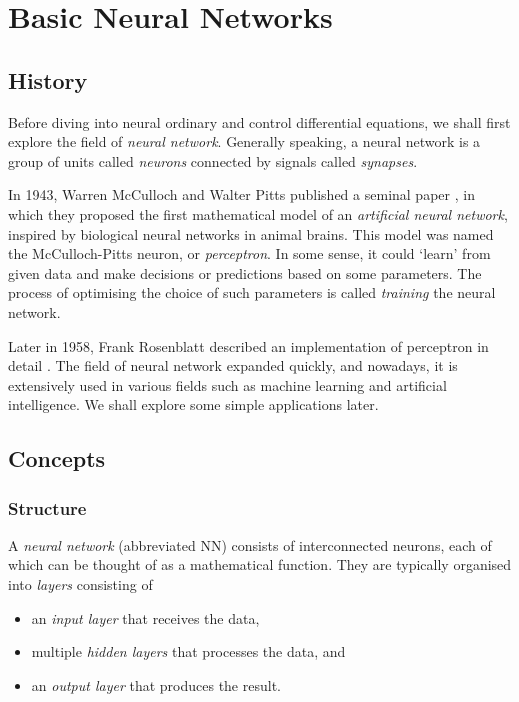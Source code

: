 \documentclass[a4paper,11pt,titlepage]{article}
\theoremstyle{definition}
\theoremstyle{plain}
\theoremstyle{remark}
\begin{document}
\pagebreak
\section{Basic Neural Networks}
\label{sec:neuralnetworks}
\subsection{History}

Before diving into neural ordinary and control differential equations, we shall first explore the field of \textit{neural network}. Generally speaking, a neural network is a group of units called \textit{neurons} connected by signals called \textit{synapses}.

In 1943, Warren McCulloch and Walter Pitts published a seminal paper \cite{McCulloch1943}, in which they proposed the first mathematical model of an \textit{artificial neural network}, inspired by biological neural networks in animal brains. This model was named the McCulloch-Pitts neuron, or \textit{perceptron}. In some sense, it could ‘learn’ from given data and make decisions or predictions based on some parameters. The process of optimising the choice of such parameters is called \textit{training} the neural network.

Later in 1958, Frank Rosenblatt described an implementation of perceptron in detail \cite{Rosenblatt1958}. The field of neural network expanded quickly, and nowadays, it is extensively used in various fields such as machine learning and artificial intelligence. We shall explore some simple applications later.

\subsection{Concepts}

\subsubsection{Structure}

A \textit{neural network} (abbreviated NN) consists of interconnected neurons, each of which can be thought of as a mathematical function. They are typically organised into \textit{layers} consisting of

\begin{itemize}
    \item an \textit{input layer} that receives the data,
    \item multiple \textit{hidden layers} that processes the data, and
    \item an \textit{output layer} that produces the result.
\end{itemize}
\end{document}
